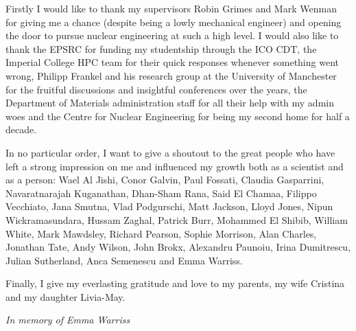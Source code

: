 \cleardoublepage


\begin{acknowledgements}

Firstly I would like to thank my supervisors Robin Grimes and Mark Wenman for giving me a chance (despite being a lowly mechanical engineer) and opening the door to pursue nuclear engineering at such a high level. I would also like to thank the EPSRC for funding my studentship through the ICO CDT, the Imperial College HPC team for their quick responses whenever something went wrong, Philipp Frankel and his research group at the University of Manchester for the fruitful discussions and insightful conferences over the years, the Department of Materials administration staff for all their help with my admin woes and the Centre for Nuclear Engineering for being my second home for half a decade.

In no particular order, I want to give a shoutout to the great people who have left a strong impression on me and influenced my growth both as a scientist and as a person: Wael Al Jishi, Conor Galvin, Paul Fossati, Claudia Gasparrini, Navaratnarajah Kuganathan, Dhan-Sham Rana, Said El Chamaa, Filippo Vecchiato, Jana Smutna, Vlad Podgurschi, Matt Jackson, Lloyd Jones, Nipun Wickramasundara, Hussam Zaghal, Patrick Burr, Mohammed El Shibib, William White, Mark Mawdsley, Richard Pearson, Sophie Morrison, Alan Charles, Jonathan Tate, Andy Wilson, John Brokx, Alexandru Paunoiu, Irina Dumitrescu, Julian Sutherland, Anca Semenescu and Emma Warriss.

Finally, I give my everlasting gratitude and love to my parents, my wife Cristina and my daughter Livia-May.

\clearpage


\begin{center}
\bigskip
\emph{In memory of Emma Warriss}
\end{center}

\end{acknowledgements}